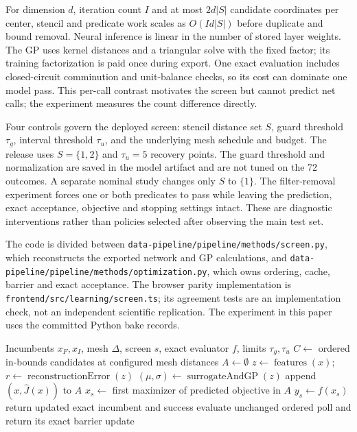 \documentclass[10pt]{article}
\begin{document}
For dimension $d$, iteration count $I$ and at most $2d|S|$ candidate coordinates per center, stencil and predicate work scales as $O(Id|S|)$ before duplicate and bound removal. Neural inference is linear in the number of stored layer weights. The GP uses kernel distances and a triangular solve with the fixed factor; its training factorization is paid once during export. One exact evaluation includes closed-circuit comminution and unit-balance checks, so its cost can dominate one model pass. This per-call contrast motivates the screen but cannot predict net calls; the experiment measures the count difference directly.

Four controls govern the deployed screen: stencil distance set $S$, guard threshold $\tau_g$, interval threshold $\tau_u$, and the underlying mesh schedule and budget. The release uses $S=\{1,2\}$ and $\tau_u=5$ recovery points. The guard threshold and normalization are saved in the model artifact and are not tuned on the 72 outcomes. A separate nominal study changes only $S$ to $\{1\}$. The filter-removal experiment forces one or both predicates to pass while leaving the prediction, exact acceptance, objective and stopping settings intact. These are diagnostic interventions rather than policies selected after observing the main test set.

The code is divided between \texttt{data-pipeline/pipeline/methods/screen.py}, which reconstructs the exported network and GP calculations, and \texttt{data-pipeline/pipeline/methods/optimization.py}, which owns ordering, cache, barrier and exact acceptance. The browser parity implementation is \texttt{frontend/src/learning/screen.ts}; its agreement tests are an implementation check, not an independent scientific replication. The experiment in this paper uses the committed Python bake records.

\begin{algorithm}[htbp]
\caption{Guarded surrogate search step with exact incumbent acceptance}
\label{alg:screen}
\begin{algorithmic}[1]
\Require Incumbents $x_F,x_I$, mesh $\Delta$, screen $s$, exact evaluator $f$, limits $\tau_g,\tau_u$
\State $C\gets$ ordered in-bounds candidates at configured mesh distances
\State $A\gets\emptyset$
  \State $z\gets\operatorname{features}(x)$; $r\gets\operatorname{reconstructionError}(z)$
    \State $(\mu,\sigma)\gets\operatorname{surrogateAndGP}(z)$
      \State append $(x,\widehat J(x))$ to $A$
    \EndIf
  \EndIf
\EndFor
{}
  \State $x_s\gets$ first maximizer of predicted objective in $A$
  \State $y_s\gets f(x_s)$
    \State return updated exact incumbent and success
  \EndIf
\EndIf
\State evaluate unchanged ordered poll and return its exact barrier update
\end{algorithmic}
\end{algorithm}
\end{document}
